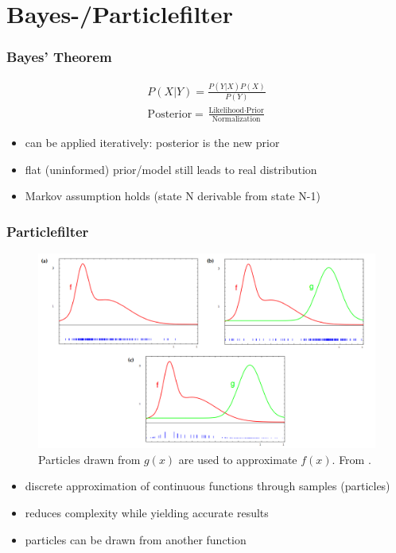 \documentclass{beamer}
\begin{document}
\section{Bayes-/Particlefilter}

\begin{frame}
  \frametitle{Bayes' Theorem}
  \begin{align*}
  P(X|Y) = \frac{P(Y|X)P(X)}{P(Y)}
  \end{align*}
  \begin{align*}
  \text{Posterior} = \frac{\text{Likelihood} \cdot \text{Prior}}{\text{Normalization}}
  \end{align*}
  \begin{itemize}
    \item can be applied iteratively: posterior is the new prior
    \item flat (uninformed) prior/model still leads to real distribution
    \item Markov assumption holds (state N derivable from state N-1)
  \end{itemize}
\end{frame}

\begin{frame}
  \frametitle{Particlefilter}
  \begin{figure}
    \centering
    \includegraphics[height=.5\textheight]{../pics/particlefilter}
    \caption{Particles drawn from $g(x)$ are used to approximate $f(x)$. From \cite{ThrunBurgardFox:2005}.}
    \label{particlefilter}
  \end{figure}
	\begin{itemize}
    \item discrete approximation of continuous functions through samples (particles)
    \item reduces complexity while yielding accurate results
    \item particles can be drawn from another function
  \end{itemize}
\end{frame}
\end{document}
